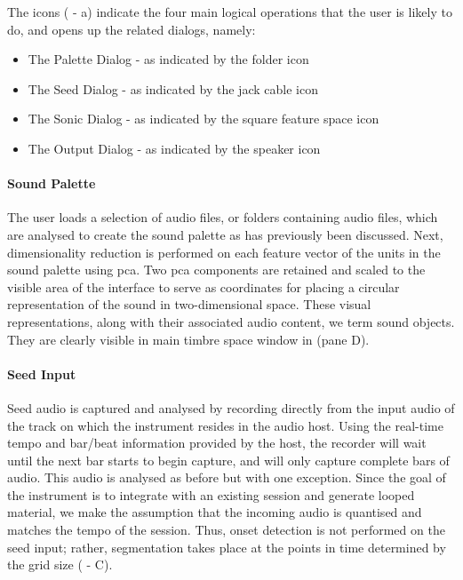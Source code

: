  
The icons ( - a) indicate the four main logical operations that the user is likely to do, and opens up the related dialogs, namely:
\begin{itemize}
  \item The Palette Dialog - as indicated by the folder icon
  \item The Seed Dialog - as indicated by the jack cable icon
  \item The Sonic Dialog - as indicated by the square feature space icon
  \item The Output Dialog - as indicated by the speaker icon
\end{itemize}

\paragraph{Sound Palette}

The user loads a selection of audio files, or folders containing audio files, which are analysed to create the sound palette as has previously been discussed. Next, dimensionality reduction is performed on each feature vector of the units in the sound palette using \acrfull{pca}. Two \acrshort{pca} components are retained and scaled to the visible area of the interface to serve as coordinates for placing a circular representation of the sound in two-dimensional space. These visual representations, along with their associated audio content, we term sound objects. They are clearly visible in main timbre space window in  (pane D).

\paragraph{Seed Input}

Seed audio is captured and analysed by recording directly from the input audio of the track on which the instrument resides in the audio host. Using the real-time tempo and bar/beat information provided by the host, the recorder will wait until the next bar starts to begin capture, and will only capture complete bars of audio. This audio is analysed as before but with one exception. Since the goal of the instrument is to integrate with an existing session and generate looped material, we make the assumption that the incoming audio is quantised and matches the tempo of the session. Thus, onset detection is not performed on the seed input; rather, segmentation takes place at the points in time determined by the grid size ( - C).

